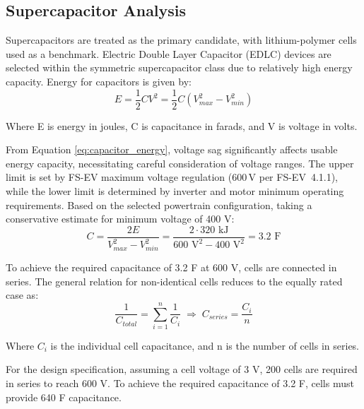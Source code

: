 \subsection{Supercapacitor Analysis}
\label{subsec:supercapacitor_analysis}

Supercapacitors are treated as the primary candidate, with lithium-polymer cells used as a benchmark. Electric Double Layer Capacitor (EDLC) devices are selected within the symmetric supercapacitor class due to relatively high energy capacity. Energy for capacitors is given by:
\begin{equation}
E=\frac{1}{2}CV^2 = \frac{1}{2} C (V_{max}^2-V_{min}^2)
\label{eq:capacitor_energy}
\end{equation}

Where E is energy in joules, C is capacitance in farads, and V is voltage in volts.

From Equation \eqref{eq:capacitor_energy}, voltage sag significantly affects usable energy capacity, necessitating careful consideration of voltage ranges. The upper limit is set by FS-EV maximum voltage regulation (600\,V per FS-EV~4.1.1), while the lower limit is determined by inverter and motor minimum operating requirements. Based on the selected powertrain configuration, taking a conservative estimate for minimum voltage of 400 V:
\begin{equation}
C=\frac{2 E}{V_{max}^2-V_{min}^2}=\frac{2 \cdot 320\text{ kJ}}{600\text{ V}^2-400\text{ V}^2}=3.2\text{ F}
\label{eq:required_capacitance}
\end{equation}

To achieve the required capacitance of 3.2 F at 600 V, cells are connected in series. The general relation for non-identical cells reduces to the equally rated case as:
\begin{equation}
\frac{1}{C_{total}} = \sum_{i=1}^{n} \frac{1}{C_{i}}\;\Rightarrow\;C_{series}=\frac{C_{i}}{n}
\label{eq:series_capacitance}
\end{equation}

Where \(C_i\) is the individual cell capacitance, and n is the number of cells in series.

For the design specification, assuming a cell voltage of 3 V, 200 cells are required in series to reach 600 V. To achieve the required capacitance of 3.2 F, cells must provide 640 F capacitance.

